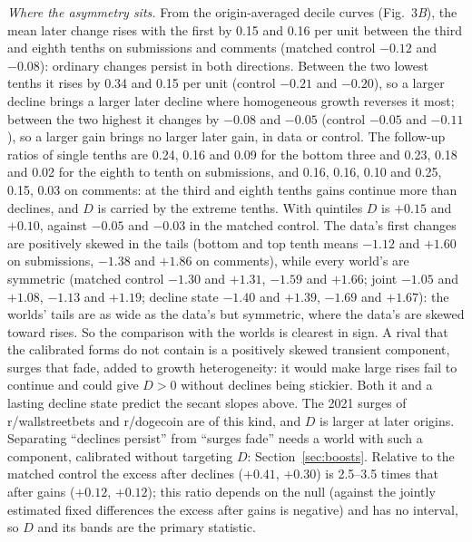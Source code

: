 \documentclass[10pt]{article}
\begin{document}
\emph{Where the asymmetry sits.} From the origin-averaged decile curves (Fig.~3\textit{B}), the mean later change rises with the first by 0.15 and 0.16 per unit between the third and eighth tenths on submissions and comments (matched control $-0.12$ and $-0.08$): ordinary changes persist in both directions. Between the two lowest tenths it rises by 0.34 and 0.15 per unit (control $-0.21$ and $-0.20$), so a larger decline brings a larger later decline where homogeneous growth reverses it most; between the two highest it changes by $-0.08$ and $-0.05$ (control $-0.05$ and $-0.11$), so a larger gain brings no larger later gain, in data or control. The follow-up ratios of single tenths are 0.24, 0.16 and 0.09 for the bottom three and 0.23, 0.18 and 0.02 for the eighth to tenth on submissions, and 0.16, 0.16, 0.10 and 0.25, 0.15, 0.03 on comments: at the third and eighth tenths gains continue more than declines, and $D$ is carried by the extreme tenths. With quintiles $D$ is $+0.15$ and $+0.10$, against $-0.05$ and $-0.03$ in the matched control. The data's first changes are positively skewed in the tails (bottom and top tenth means $-1.12$ and $+1.60$ on submissions, $-1.38$ and $+1.86$ on comments), while every world's are symmetric (matched control $-1.30$ and $+1.31$, $-1.59$ and $+1.66$; joint $-1.05$ and $+1.08$, $-1.13$ and $+1.19$; decline state $-1.40$ and $+1.39$, $-1.69$ and $+1.67$): the worlds' tails are as wide as the data's but symmetric, where the data's are skewed toward rises. So the comparison with the worlds is clearest in sign. A rival that the calibrated forms do not contain is a positively skewed transient component, surges that fade, added to growth heterogeneity: it would make large rises fail to continue and could give $D > 0$ without declines being stickier. Both it and a lasting decline state predict the secant slopes above. The 2021 surges of r/wallstreetbets and r/dogecoin are of this kind, and $D$ is larger at later origins. Separating ``declines persist'' from ``surges fade'' needs a world with such a component, calibrated without targeting $D$: Section~\ref{sec:boosts}. Relative to the matched control the excess after declines ($+0.41$, $+0.30$) is 2.5--3.5 times that after gains ($+0.12$, $+0.12$); this ratio depends on the null (against the jointly estimated fixed differences the excess after gains is negative) and has no interval, so $D$ and its bands are the primary statistic.
\end{document}
